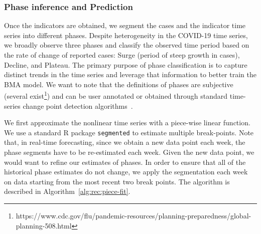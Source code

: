 \documentclass[conference,compsoc]{IEEEtran}
\begin{document}

\subsubsection{Phase inference and Prediction} \label{phase:classification}
Once the indicators are obtained, we segment the cases and the indicator time series into different phases. Despite heterogeneity in the COVID-19 time series, we  broadly observe three phases and classify the observed time period based on the rate of change of reported cases: Surge (period of steep growth in cases), Decline, and Plateau. The primary purpose of phase classification is to capture distinct trends in the time series and leverage that information to better train the BMA model. We want to note that the definitions of phases are subjective (several exist\footnote{https://www.cdc.gov/flu/pandemic-resources/planning-preparedness/global-planning-508.html}) and can be user annotated or obtained through standard time-series change point detection algorithms~\cite{aminikhanghahi2017survey}.  

We first approximate the nonlinear time series with a piece-wise linear function. We use a standard R package \verb|segmented| \cite{Rsegmented} to estimate multiple break-points. Note that, in real-time forecasting, since we obtain a new data point each week, the phase segments have to be re-estimated each week. Given the new data point, we would want to refine our estimates of phases. In order to ensure that all of the historical phase estimates do not change, we apply the segmentation each week on data starting from the most recent two break points. The algorithm is described in Algorithm~\ref{alg:rec:piece-fit}.
\end{document}
